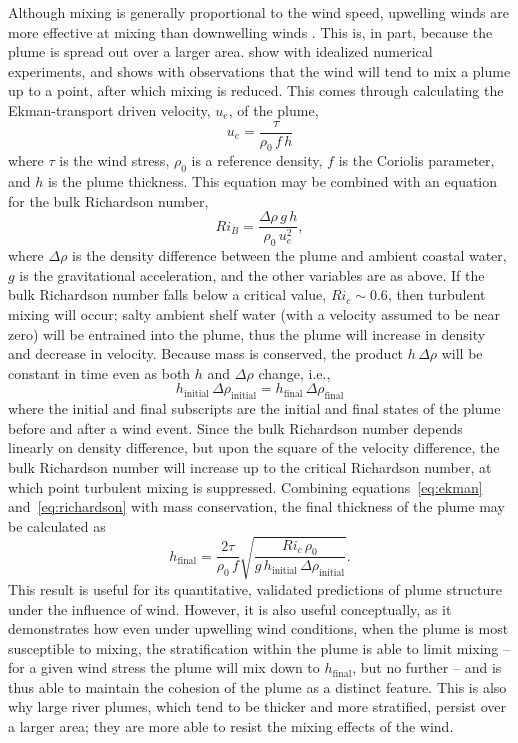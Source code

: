 \documentclass[11pt]{report}
\numberwithin{equation}{section}
\begin{document}
Although mixing is generally proportional to the wind speed, upwelling winds are more effective at mixing than downwelling winds \citep{hetland:05}.  This is, in part, because the plume is spread out over a larger area.  \citet{fong.geyer:01} show with idealized numerical experiments, and \citet{lentz:04} shows with observations that the wind will tend to mix a plume up to a point, after which mixing is reduced.  This comes through calculating the Ekman-transport driven velocity, $u_e$, of the plume,
\begin{equation}
    \label{eq:ekman}
    u_e = \frac{\tau}{\rho_0\,f\,h}
\end{equation}
where $\tau$ is the wind stress, $\rho_0$ is a reference density, $f$ is the Coriolis parameter, and $h$ is the plume thickness.  This equation may be combined with an equation for the bulk Richardson number,
\begin{equation}
    \label{eq:richardson}
    Ri_B = \frac{\Delta\rho\,g\,h}{\rho_0\,u_e^2},
\end{equation}
where $\Delta\rho$ is the density difference between the plume and ambient coastal water, $g$ is the gravitational acceleration, and the other variables are as above.
If the bulk Richardson number falls below a critical value, $Ri_c\sim0.6$, then turbulent mixing will occur; salty ambient shelf water (with a velocity assumed to be near zero) will be entrained into the plume, thus the plume will increase in density and decrease in velocity.  Because mass is conserved, the product $h\,\Delta\rho$ will be constant in time even as both $h$ and $\Delta\rho$ change, i.e., 
\begin{equation}
    h_{\mathrm{initial}}\,\Delta\rho_{\mathrm{initial}} = h_{\mathrm{final}}\,\Delta\rho_{\mathrm{final}}
\end{equation}
where the initial and final subscripts are the initial and final states of the plume before and after a wind event.  Since the bulk Richardson number depends linearly on density difference, but upon the square of the velocity difference, the bulk Richardson number will increase up to the critical Richardson number, at which point turbulent mixing is suppressed.  Combining equations~\ref{eq:ekman} and~\ref{eq:richardson} with mass conservation, the final thickness of the plume may be calculated \citep{fong.geyer:01, lentz:04, hetland:05b} as
\begin{equation}
    h_{\mathrm{final}} = \frac{2 \tau}{\rho_0\,f}\sqrt{\frac{Ri_c\,\rho_0}{g\,h_{\mathrm{initial}}\,\Delta\rho_{\mathrm{initial}}}}.
\end{equation}
This result is useful for its quantitative, validated predictions of plume structure under the influence of wind.  However, it is also useful conceptually, as it demonstrates how even under upwelling wind conditions, when the plume is most susceptible to mixing, the stratification within the plume is able to limit mixing -- for a given wind stress the plume will mix down to $h_{\mathrm{final}}$, but no further -- and is thus able to maintain the cohesion of the plume as a distinct feature.  This is also why large river plumes, which tend to be thicker and more stratified, persist over a larger area; they are more able to resist the mixing effects of the wind.
\end{document}
